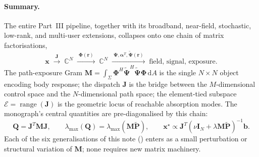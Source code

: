 \documentclass[11pt,a4paper]{article}
\theoremstyle{definition}
\newcommand{\rr}{\mathbf{r}}
\newcommand{\diff}{\mathrm{d}}
\newcommand{\Complex}{\mathbb{C}}
\newcommand{\Jmat}{\mathbf{J}}                 %
\newcommand{\Phimat}{\mathbf{\Phi}}            %
\newcommand{\Psimat}{\bm{\Psi}}                %
\newcommand{\Psitil}{\tilde{\bm{\Psi}}}        %
\newcommand{\Mmat}{\mathbf{M}}                 %
\newcommand{\Qmat}{\mathbf{Q}}                 %
\newcommand{\Pmat}{\tilde{\mathbf{P}}}         %
\newcommand{\xx}{\mathbf{x}}
\newcommand{\bvec}{\mathbf{b}}
\newcommand{\alphavec}{\bm{\alpha}}
\newcommand{\Id}{\mathbf{I}}
\newcommand{\Sigmabody}{\Sigma}
\begin{document}
\paragraph{Summary.}  The entire Part~III pipeline, together with its
broadband, near-field, stochastic, low-rank, and multi-user extensions,
collapses onto one chain of matrix factorisations,
\[
  \xx\;\xrightarrow{\;\Jmat\;}\;\Complex^N
  \;\xrightarrow{\;\Phimat(\rr)\;}\;\Complex^N
  \;\xrightarrow{\;\Psimat,\alphavec^T,\Psitil(\rr)\;}\;
  \text{field, signal, exposure.}
\]
The path-exposure Gram
$\Mmat=\int_\Sigmabody\Phimat^H\Psitil^H\Psitil\Phimat\,\diff A$ is the
single $N\times N$ object encoding body response; the dispatch $\Jmat$
is the bridge between the $M$-dimensional control space and the
$N$-dimensional path space; the element-tied subspace
$\mathcal E=\operatorname{range}(\Jmat)$ is the geometric locus of
reachable absorption modes.  The monograph's central quantities are
pre-diagonalised by this chain:
\[
  \Qmat=\Jmat^T\Mmat\Jmat,\qquad
  \lambda_{\max}(\Qmat)=\lambda_{\max}(\Mmat\Pmat),\qquad
  \xx^\star\propto\Jmat^T(\nu\Id_N+\lambda\Mmat\Pmat)^{-1}\bvec.
\]
Each of the six generalisations of this note
()
enters as a small perturbation or structural variation of $\Mmat$; none
requires new matrix machinery.
\end{document}
